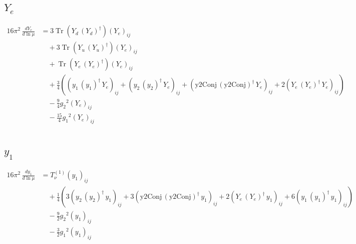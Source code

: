 \documentclass[10pt,a4paper]{article}
\begin{document}
\subsection*{$Y_e$}
\begin{align*}
16\pi^2\,\frac{d Y_e}{d\ln\mu} &=3 \operatorname{Tr}\!\left({Y_d}\,\left({Y_d}\right)^{\dagger}\right) \left({Y_e}\right)_{ij} \\
&\quad +3 \operatorname{Tr}\!\left({Y_u}\,\left({Y_u}\right)^{\dagger}\right) \left({Y_e}\right)_{ij} \\
&\quad +\operatorname{Tr}\!\left({Y_e}\,\left({Y_e}\right)^{\dagger}\right) \left({Y_e}\right)_{ij} \\
&\quad +\frac{3}{4} (\left({y_1}\,\left({y_1}\right)^{\dagger}\,{Y_e}\right)_{ij}+\left({y_2}\,\left({y_2}\right)^{\dagger}\,{Y_e}\right)_{ij}+\left(\text{y2Conj}\,\left(\text{y2Conj}\right)^{\dagger}\,{Y_e}\right)_{ij}+2 \left({Y_e}\,\left({Y_e}\right)^{\dagger}\,{Y_e}\right)_{ij}) \\
&\quad -\frac{9}{4} {g_2}^2 \left({Y_e}\right)_{ij} \\
&\quad -\frac{15}{4} {g_1}^2 \left({Y_e}\right)_{ij} \\
\end{align*}
\subsection*{$y_1$}
\begin{align*}
16\pi^2\,\frac{d y_1}{d\ln\mu} &=T_{\nu}^{(1)} \left({y_1}\right)_{ij} \\
&\quad +\frac{1}{4} (3 \left({y_2}\,\left({y_2}\right)^{\dagger}\,{y_1}\right)_{ij}+3 \left(\text{y2Conj}\,\left(\text{y2Conj}\right)^{\dagger}\,{y_1}\right)_{ij}+2 \left({Y_e}\,\left({Y_e}\right)^{\dagger}\,{y_1}\right)_{ij}+6 \left({y_1}\,\left({y_1}\right)^{\dagger}\,{y_1}\right)_{ij}) \\
&\quad -\frac{9}{2} {g_2}^2 \left({y_1}\right)_{ij} \\
&\quad -\frac{3}{2} {g_1}^2 \left({y_1}\right)_{ij} \\
\end{align*}
\end{document}
